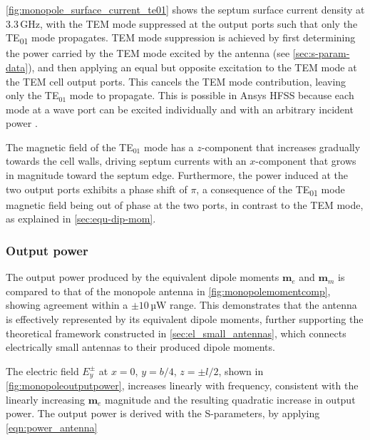 \autoref{fig:monopole_surface_current_te01} shows the septum surface current density at 3.3\,GHz, with the TEM mode suppressed at the output ports such that only the TE\textsubscript{01} mode propagates. TEM mode suppression is achieved by first determining the power carried by the TEM mode excited by the antenna (see \cref{sec:s-param-data}), and then applying an equal but opposite excitation to the TEM mode at the TEM cell output ports. This cancels the TEM mode contribution, leaving only the TE$_{01}$ mode to propagate. This is possible in Ansys HFSS because each mode at a wave port can be excited individually and with an arbitrary incident power \cite[pp.~46--47]{kopp_hfss}.

The magnetic field of the TE$_{01}$ mode has a $z$-component that increases gradually towards the cell walls, driving septum currents with an $x$-component that grows in magnitude toward the septum edge. Furthermore, the power induced at the two output ports exhibits a phase shift of $\pi$, a consequence of the TE\textsubscript{01} mode magnetic field being out of phase at the two ports, in contrast to the TEM mode, as explained in \cref{sec:equ-dip-mom}.

\subsubsection{Output power}\label{sec:output_power_mon}

The output power produced by the equivalent dipole moments $\mathbf{m}_e$ and $\mathbf{m}_m$ is compared to that of the monopole antenna in \autoref{fig:monopolemomentcomp}, showing agreement within a $\pm10\,$µW range. This demonstrates that the antenna is effectively represented by its equivalent dipole moments, further supporting the theoretical framework constructed in \cref{sec:el_small_antennas}, which connects electrically small antennas to their produced dipole moments.

The electric field $E^\pm_y$ at $x=0$, $y=b/4$, $z=\pm l/2$, shown in \autoref{fig:monopoleoutputpower}, increases linearly with frequency, consistent with the linearly increasing $\mathbf{m}_e$ magnitude and the resulting quadratic increase in output power. The output power is derived with the S-parameters, by applying \eqref{eqn:power_antenna}

